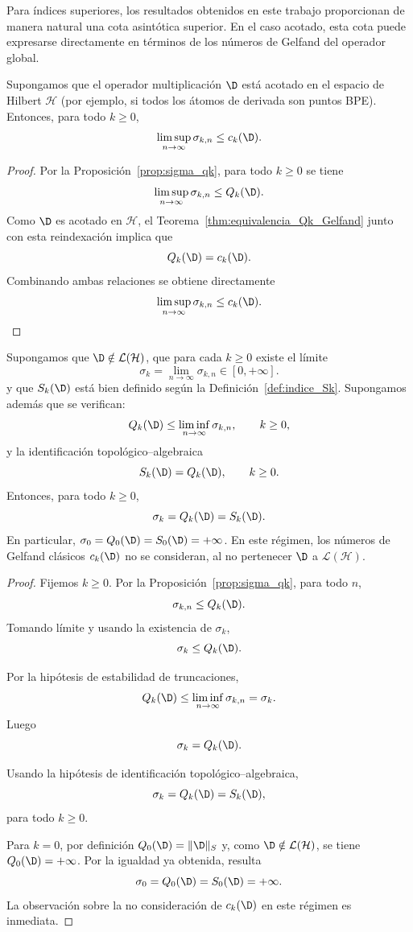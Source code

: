 Para índices superiores, los resultados obtenidos en este trabajo proporcionan de manera natural una cota asintótica superior. En el caso acotado, esta cota puede expresarse directamente en términos de los números de Gelfand del operador global.

\begin{cor}\label{cor:convergencia_qk_condicional}
	Supongamos que el operador multiplicación $\D$ está acotado en el espacio de Hilbert $\mathcal{H}$ (por ejemplo, si todos los átomos de derivada son puntos BPE). Entonces, para todo $k \ge 0$,
	\[
		\limsup_{n \to \infty} \sigma_{k,n} \le c_k(\D).
	\]
\end{cor}

\begin{proof}
	Por la Proposición~\ref{prop:sigma_qk}, para todo $k \ge 0$ se tiene
	\[
		\limsup_{n \to \infty} \sigma_{k,n} \le Q_k(\D).
	\]
	Como $\D$ es acotado en $\mathcal{H}$, el Teorema~\ref{thm:equivalencia_Qk_Gelfand} junto con esta reindexación implica que
	\[
		Q_k(\D) = c_k(\D).
	\]
	Combinando ambas relaciones se obtiene directamente
	\[
		\limsup_{n \to \infty} \sigma_{k,n} \le c_k(\D).
	\]
\end{proof}

\begin{prop}\label{prop:coincidencia_no_acotado_pendiente}
	Supongamos que $\D\notin\mathcal{L}(\mathcal{H})$, que para cada $k\ge0$ existe el límite
	\[
		\sigma_k=\lim_{n\to\infty}\sigma_{k,n}\in[0,+\infty].
	\]
	y que $S_k(\D)$ está bien definido según la Definición~\ref{def:indice_Sk}. Supongamos además que se verifican:
	\[
		Q_k(\D)\le \liminf_{n\to\infty}\sigma_{k,n},
		\qquad k\ge0,
	\]
	y la identificación topológico--algebraica
	\[
		S_k(\D)=Q_k(\D),
		\qquad k\ge0.
	\]
	Entonces, para todo $k\ge0$,
	\[
		\sigma_{k}=Q_k(\D)=S_k(\D).
	\]
	En particular, $\sigma_0=Q_0(\D)=S_0(\D)=+\infty$. En este régimen, los números de Gelfand clásicos $c_k(\D)$ no se consideran, al no pertenecer $\D$ a $\mathcal{L}(\mathcal{H})$.
\end{prop}

\begin{proof}
	Fijemos $k\ge 0$. Por la Proposición~\ref{prop:sigma_qk}, para todo $n$,
	\[
		\sigma_{k,n}\le Q_k(\D).
	\]
	Tomando límite y usando la existencia de $\sigma_k$,
	\[
		\sigma_k\le Q_k(\D).
	\]

	Por la hipótesis de estabilidad de truncaciones,
	\[
		Q_k(\D)\le \liminf_{n\to\infty}\sigma_{k,n}=\sigma_k.
	\]
	Luego
	\[
		\sigma_k=Q_k(\D).
	\]

	Usando la hipótesis de identificación topológico--algebraica,
	\[
		\sigma_k=Q_k(\D)=S_k(\D),
	\]
	para todo $k\ge0$.

	Para $k=0$, por definición $Q_0(\D)=\|\D\|_S$ y, como
	$\D\notin\mathcal L(\mathcal H)$, se tiene $Q_0(\D)=+\infty$.
	Por la igualdad ya obtenida, resulta
	\[
		\sigma_0=Q_0(\D)=S_0(\D)=+\infty.
	\]
	La observación sobre la no consideración de $c_k(\D)$ en este régimen es inmediata.
\end{proof}

